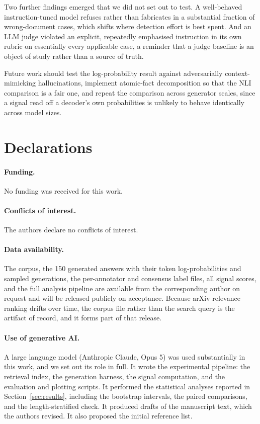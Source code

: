 \documentclass[11pt,a4paper]{article}
\begin{document}
Two further findings emerged that we did not set out to test. A well-behaved
instruction-tuned model refuses rather than fabricates in a substantial fraction
of wrong-document cases, which shifts where detection effort is best spent. And
an LLM judge violated an explicit, repeatedly emphasised instruction in its own
rubric on essentially every applicable case, a reminder that a judge baseline
is an object of study rather than a source of truth.

Future work should test the log-probability result against adversarially
context-mimicking hallucinations, implement atomic-fact decomposition so that
the NLI comparison is a fair one, and repeat the comparison across generator
scales, since a signal read off a decoder's own probabilities is unlikely to
behave identically across model sizes.

\section*{Declarations}

\paragraph{Funding.}
No funding was received for this work.

\paragraph{Conflicts of interest.}
The authors declare no conflicts of interest.

\paragraph{Data availability.}
The corpus, the 150 generated answers with their token log-probabilities and
sampled generations, the per-annotator and consensus label files, all signal
scores, and the full analysis pipeline are available from the corresponding
author on request and will be released publicly on acceptance. Because arXiv
relevance ranking drifts over time, the corpus file rather than the search query
is the artifact of record, and it forms part of that release.

\paragraph{Use of generative AI.}
A large language model (Anthropic Claude, Opus 5) was used substantially in this
work, and we set out its role in full. It wrote the experimental pipeline: the
retrieval index, the generation harness, the signal computation, and the
evaluation and plotting scripts. It performed the statistical analyses reported
in Section~\ref{sec:results}, including the bootstrap intervals, the paired
comparisons, and the length-stratified check. It produced drafts of the
manuscript text, which the authors revised. It also proposed the initial
reference list.
\end{document}
